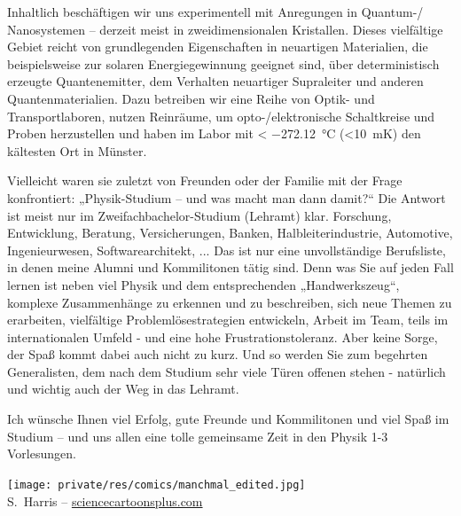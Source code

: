 \begin{multicols}{2}
Inhaltlich beschäftigen wir uns experimentell mit Anregungen in Quantum-/ Nanosystemen – derzeit meist in zweidimensionalen Kristallen. Dieses vielfältige Gebiet reicht von grundlegenden Eigenschaften in neuartigen Materialien, die beispielsweise zur solaren Energiegewinnung geeignet sind, über deterministisch erzeugte Quantenemitter, dem Verhalten neuartiger Supraleiter und anderen Quantenmaterialien. Dazu betreiben wir eine Reihe von Optik- und Transportlaboren, nutzen Reinräume, um opto-/elektronische Schaltkreise und Proben herzustellen und haben im Labor mit < \SI{-272.12}{\celsius} (<\SI{10}{\milli \kelvin}) den kältesten Ort in Münster. 

Vielleicht waren sie zuletzt von Freunden oder der Familie mit der Frage konfrontiert: „Physik-Studium – und was macht man dann damit?“ Die Antwort ist meist nur im Zweifachbachelor-Studium (Lehramt) klar. Forschung, Entwicklung, Beratung, Versicherungen, Banken, Halbleiterindustrie, Automotive, Ingenieurwesen, Softwarearchitekt, ... Das ist nur eine unvollständige Berufsliste, in denen meine Alumni und Kommilitonen tätig sind. Denn was Sie auf jeden Fall lernen ist neben viel Physik und dem entsprechenden „Handwerkszeug“, komplexe Zusammenhänge zu erkennen und zu beschreiben, sich neue Themen zu erarbeiten, vielfältige Problemlösestrategien entwickeln, Arbeit im Team, teils im internationalen Umfeld - und eine hohe Frustrationstoleranz. Aber keine Sorge, der Spaß kommt dabei auch nicht zu kurz. Und so werden Sie zum begehrten Generalisten, dem nach dem Studium sehr viele Türen offenen stehen - natürlich und wichtig auch der Weg in das Lehramt.

Ich wünsche Ihnen viel Erfolg, gute Freunde und Kommilitonen und viel Spaß im Studium – und uns allen eine tolle gemeinsame Zeit in den Physik 1-3 Vorlesungen. 

\begin{center}
\texttt{[image: private/res/comics/manchmal\_edited.jpg]}\\
{\footnotesize 
S.~Harris – \url{sciencecartoonsplus.com}
}
\end{center}

\end{multicols}

\vfill

\newpage

